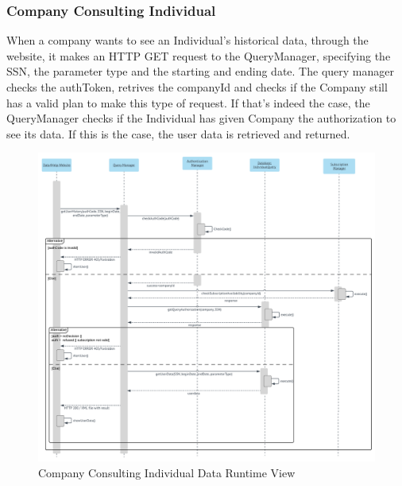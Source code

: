 \subsubsection{Company Consulting Individual}
When a company wants to see an Individual's historical data, through the website, it makes an HTTP GET request to the QueryManager, specifying the SSN, the parameter type and the starting and ending date. The query manager checks the authToken, retrives the companyId and checks if the Company still has a valid plan to make this type of request. If that's indeed the case, the QueryManager checks if the Individual has given Company the authorization to see its data. If this is the case, the user data is retrieved and returned.
\begin{figure}[H]
	\includegraphics[width=\textwidth,height=\textheight,keepaspectratio]{assets/flowCharts/CompanyConsultingIndividualData.pdf}
	\caption{Company Consulting Individual Data Runtime View}
	\label{fig:CompanyConsultingIndividualData}
\end{figure}

